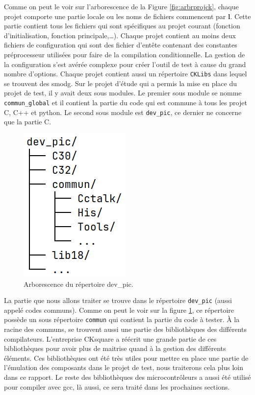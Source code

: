 \documentclass[a4paper]{article}
\begin{document}
Comme on peut le voir sur l'arborescence de la Figure \ref{fig:arbrprojck},
chaque projet comporte une partie locale ou les noms de fichiers commencent par
\textbf{l}. Cette partie contient tous les fichiers qui sont spécifiques au
projet courant (fonction d'initialisation, fonction principale,\dots). Chaque
projet contient au moins deux fichiers de configuration qui sont des fichier
d'entête contenant des constantes préprocesseur utilisées pour faire de la
compilation conditionnelle. La gestion de la configuration s'est avérée complexe
pour créer l'outil de test à cause du grand nombre d'options. Chaque projet
contient aussi un répertoire \verb|CKLibs| dans lequel se trouvent des
\gls{smodg}. Sur le projet d'étude qui a permis la mise en place du projet de
test, il y avait deux sous modules. Le premier sous module se nomme
\verb|commun_global| et il contient la partie du code qui est commune à tous les
projet C, C++ et python. Le second sous module est \verb|dev_pic|, ce dernier ne
concerne que la partie C.

\begin{figure}[h!]
  \begin{center}
    \includegraphics[scale=0.5]{./img/arborescence-devpic.png}
    \caption{Arborescence du répertoire dev\_pic.}
    \label{fig:repdevpic}
  \end{center}
\end{figure}

La partie que nous allons traiter se trouve dans le répertoire \verb|dev_pic|
(aussi appelé codes communs). Comme on peut le voir sur la figure
\ref{fig:repdevpic}, ce répertoire possède un sous répertoire \verb|commun| qui
contient la partie du code à tester. À la racine des communs, se trouvent aussi
une partie des bibliothèques des différents compilateurs. L'entreprise CKsquare
a réécrit une grande partie de ces bibliothèques pour avoir plus de maitrise
quand à la gestion des différents éléments. Ces bibliothèques ont été très
utiles pour mettre en place une partie de l'émulation des composants dans le
projet de test, nous traiterons cela plus loin dans ce rapport. Le reste des
bibliothèques des microcontrôleurs a aussi été utilisé pour compiler avec gcc,
là aussi, ce sera traité dans les prochaines sections.
\end{document}
